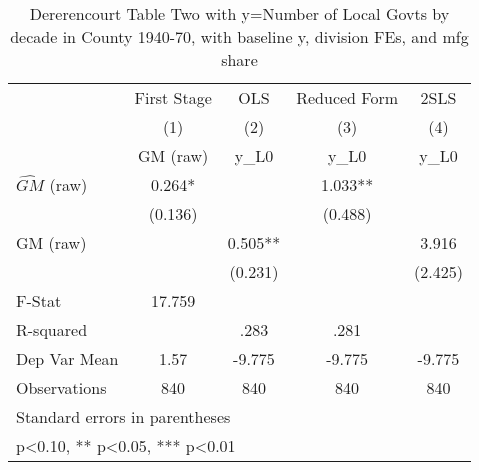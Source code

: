 \begin{table}[htbp]\centering
\def\sym#1{\ifmmode^{#1}\else\(^{#1}\)\fi}
\caption{Dererencourt Table Two with y=Number of Local Govts by decade in County 1940-70, with baseline y, division FEs, and mfg share}
\begin{tabular}{l*{4}{c}}
\toprule
                    & First Stage   &         OLS   &Reduced Form   &        2SLS   \\
                    &\multicolumn{1}{c}{(1)}&\multicolumn{1}{c}{(2)}&\multicolumn{1}{c}{(3)}&\multicolumn{1}{c}{(4)}\\
                    &\multicolumn{1}{c}{GM  (raw)}&\multicolumn{1}{c}{y\_L0}&\multicolumn{1}{c}{y\_L0}&\multicolumn{1}{c}{y\_L0}\\
\midrule
$\hat{GM}$ (raw)    &       0.264*  &               &       1.033** &               \\
                    &     (0.136)   &               &     (0.488)   &               \\
\addlinespace
GM  (raw)           &               &       0.505** &               &       3.916   \\
                    &               &     (0.231)   &               &     (2.425)   \\
\midrule
F-Stat              &      17.759   &               &               &               \\
R-squared           &               &        .283   &        .281   &               \\
Dep Var Mean        &        1.57   &      -9.775   &      -9.775   &      -9.775   \\
Observations        &         840   &         840   &         840   &         840   \\
\bottomrule
\multicolumn{5}{l}{\footnotesize Standard errors in parentheses}\\
\multicolumn{5}{l}{\footnotesize * p<0.10, ** p<0.05, *** p<0.01}\\
\end{tabular}
\end{table}

